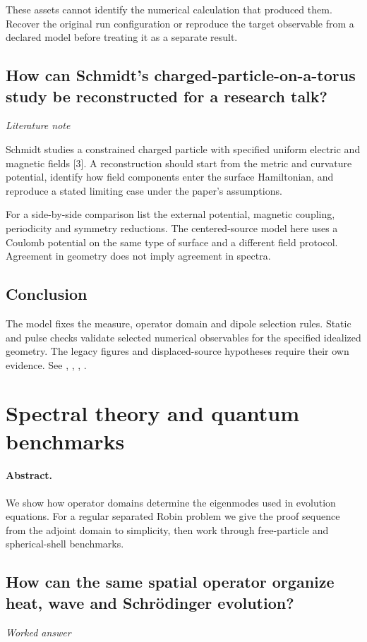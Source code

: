 \documentclass[11pt]{article}
\begin{document}
These assets cannot identify the numerical calculation that produced them. Recover the original run configuration or reproduce the target observable from a declared model before treating it as a separate result.

\subsection{How can Schmidt's charged-particle-on-a-torus study be reconstructed for a research talk?}
\label{problem:torus-literature}
\textit{Literature note}

Schmidt studies a constrained charged particle with specified uniform electric and magnetic fields [3]. A reconstruction should start from the metric and curvature potential, identify how field components enter the surface Hamiltonian, and reproduce a stated limiting case under the paper's assumptions.

For a side-by-side comparison list the external potential, magnetic coupling, periodicity and symmetry reductions. The centered-source model here uses a Coulomb potential on the same type of surface and a different field protocol. Agreement in geometry does not imply agreement in spectra.

\subsection*{Conclusion}
The model fixes the measure, operator domain and dipole selection rules. Static and pulse checks validate selected numerical observables for the specified idealized geometry. The legacy figures and displaced-source hypotheses require their own evidence.
See \cite{ref1}, \cite{ref2}, \cite{ref3}, \cite{ref4}.

\section{Spectral theory and quantum benchmarks}
\paragraph{Abstract.} We show how operator domains determine the eigenmodes used in evolution equations. For a regular separated Robin problem we give the proof sequence from the adjoint domain to simplicity, then work through free-particle and spherical-shell benchmarks.

\subsection{How can the same spatial operator organize heat, wave and Schr\"{o}dinger evolution?}
\label{problem:pde-framework}
\textit{Worked answer}
\end{document}
